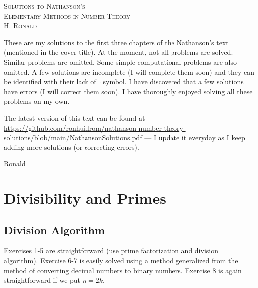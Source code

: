 \documentclass[11pt, leqno]{article}
\begin{document}
\setlength{\abovedisplayskip}{0pt}
\setlength{\belowdisplayskip}{0pt}
\setlength{\abovedisplayshortskip}{0pt}
\setlength{\belowdisplayshortskip}{0pt}

\thispagestyle{empty}

\pagebreak
\hspace{0pt}
\vfill
\begin{center}
  \Large
  \textsc{Solutions to Nathanson's \\
    Elementary Methods in Number Theory} \\
  \vspace{1em}
  \large
  \textsc{H. Ronald}
\end{center}
\vfill
\hspace{0pt}
\pagebreak

\clearpage
\thispagestyle{empty}


\pagebreak
\hspace{0pt}
\vfill
These are my solutions to the first three chapters of the Nathanson's text (mentioned in the cover title). At the moment, not all problems are solved. Similar problems are omitted. Some simple computational problems are also omitted. A few solutions are incomplete (I will complete them soon) and they can be identified with their lack of $\square{}$ symbol. I have discovered that a few solutions have errors (I will correct them soon). I have thoroughly enjoyed solving all these problems on my own.

The latest version of this text can be found at \hyperref{https://github.com/ronhuidrom/nathanson-number-theory-solutions/blob/main/NathansonSolutions.pdf}{}{}{https://github.com/ronhuidrom/nathanson-number-theory-solutions/blob/main/NathansonSolutions.pdf} --- I update it everyday as I keep adding more solutions (or correcting errors).

\hfill Ronald
\vfill
\hspace{0pt}
\pagebreak
\clearpage

\tableofcontents
\clearpage

\normalsize
\section{Divisibility and Primes}

\subsection{Division Algorithm}

Exercises 1-5 are straightforward (use prime factorization and division algorithm). Exercise 6-7 is easily solved using a method generalized from the method of converting decimal numbers to binary numbers. Exercise 8 is again straightforward if we put $n=2k$.
\end{document}
